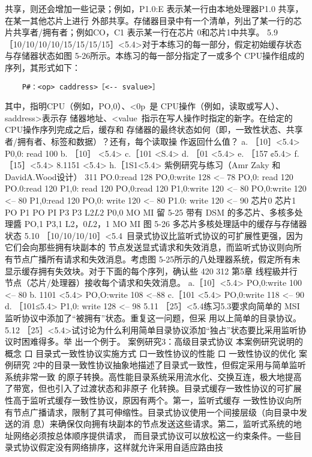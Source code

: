 共享，则还会增加一些记录；例如，P1.0:E 表示某一行由本地处理器P1.0 共享，在某一其他芯片上进行
外部共享。存储器目录中有一个清单，列出了某一行的芯片共享者/拥有者；例如CO，C1 表示某一行在芯片
0和芯片1中共享。
5.9
［10/10/10/10/15/15/15/15］<5.4>对于本练习的每一部分，假定初始缓存状态与存储器状态如图
5-26所示。本练习的每一部分指定了一或多个 CPU操作组成的序列，其形式如下：
\begin{verbatim}
    P#：<op> caddress>［<-- svalue>］
\end{verbatim}
其中，指明CPU（例如，PO,0）、<0p~是 CPU操作（例如，读取或写人）、saddress>表示存
储器地址、<value~指示在写人操作时指定的新字。在给定的 CPU操作序列完成之后，缓存和
存储器的最终状态如何（即，一致性状态、共享者/拥有者、标签和数据）？还有，每个读取操
作返回什么值？
a. ［10］<5.4> P0,0: read 100
b. ［10］ <5.4>
c.［101 <S.4>
d. ［01 <5.4>
e. ［157 ¢5.4>
f.［15］<5.4>
8.1151 <5.4>
h.［1S1<5.4>
紫例研究与练习（Amr Zaky 和DavidA.Wood设计）
311
PO.0:read 128
PO,0:write 128 <-- 78
PO,0: read 120
PO.0:read 120
P1,0: read 120
PO,0:read 120
P1,0:write 120 <-- 80
PO,0:write 120 <-- 80
P1,0:read 120
PO,0: write 120 <-- 80
P1.0: write 120 <-- 90
芯片0
芯片1
PO
P1
PO
PI
P3
P3
L2$
L2$
P0,0
MO
MI
留 5-25
带有 DSM 的多芯片、多核多处理醬
PO,1
P3,1
L2$，0
L2$，1
MO
MI
图 5-26 多芯片多核处理話中的缓存与存储器状态
5.10 ［10/10/10/10］<5.4~目录式协议比监听式协议的可扩展性更强，因为它们会向那些拥有块副本的
节点发送显式请求和失效消息，而监听式协议则向所有节点广播所有请求和失效消息。考虑图
5-25所示的八处理器系统，假定所有未显示缓存拥有失效块。对于下面的每个序列，确认些
420
312
第5章 线程級并行
节点（芯片/处理器）接收每个请求和失效消息。
a.［10］<5.4>
PO,0:write 100 <-- 80
b. 1101 <5.4>
PO,O:write 108 <--88
c.［101 <5.4>
PO,0:write 118 <-- 90
d. ［101≤5.4>
P1,0: write 128 <-- 98
5.11 ［25］<5.4练习5.3要求向简单的 MSI 监听协议中添加了“被拥有”状态。重复这一问题，但采
用以上简单的目录协议。
5.12 ［25］<5.4>试讨论为什么利用简单目录协议添加“独占”状态要比采用监听协议时困难得多。举
出一个例于。
案例研究3：高级目录式协议
本案例研究说明的概念
口 目录式一致性协议实施方式
口一致性协议的性能
口 一致性协议的优化
案例研究 2中的目录一致性协议抽象地描述了目录式一致性，但假定采用与简单监听系统非常一致
的原子转换。高性能目录系统采用流水化、交换互连，极大地提高了带宽，但也引入了过渡状态和非原子
化转换。目录式缓存一致性协议的可扩展性高于监听式缓存一致性协议，原因有两个。第一，监听式缓存
一致性协议向所有节点广播请求，限制了其可伸缩性。目录式协议使用一个间接层级（向目录中发送的消
息）来确保仅向拥有块副本的节点发送这些请求。第二，监听式系统的地址网络必须按总体顺序提供请求，
而目录式协议可以放松这一约束条件。一些目录式协议假定没有网络排序，这样就允许采用自适应路由技
